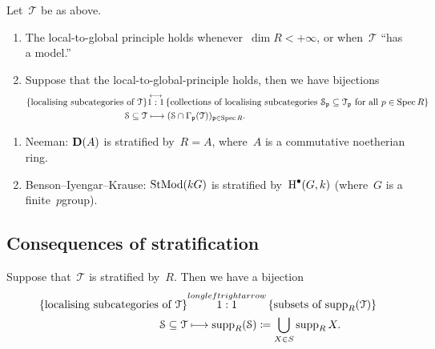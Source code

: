 \documentclass[10pt,a4paper]{article}
\begin{document}
\begin{proposition}
  Let~$\mathcal{T}$ be as above.
  \begin{enumerate}
    \item The local-to-global principle holds whenever~$\dim R<+\infty$, or when~$\mathcal{T}$ ``has a model.''
    \item Suppose that the local-to-global-principle holds, then we have bijections
      \begin{equation}
        \begin{aligned}
          \left\{ \text{localising subcategories of $\mathcal{T}$} \right\} & \overset{\longleftrightarrow}{1:1} \left\{ \text{collections of localising subcategories $\mathcal{S}_{\mathfrak{p}}\subseteq\mathcal{T}_{\mathfrak{p}}$ for all~$p\in\operatorname{Spec} R$} \right\} \\
          \mathcal{S}\subseteq\mathcal{T} & \longmapsto (\mathcal{S}\cap\Gamma_{\mathfrak{p}}(\mathcal{T}))_{\mathfrak{p}\in\operatorname{Spec} R}.
        \end{aligned}
      \end{equation}
  \end{enumerate}
\end{proposition}

\begin{example}
  \begin{enumerate}
    \item Neeman: $\mathbf{D}(A)$ is stratified by~$R=A$, where~$A$ is a commutative noetherian ring.
    \item Benson--Iyengar--Krause: $\operatorname{StMod}(kG)$ is stratified by~$\operatorname{H}^\bullet(G,k)$ (where~$G$ is a finite~$p$\dash group).
  \end{enumerate}
\end{example}

\subsection{Consequences of stratification}
\begin{theorem}
  Suppose that~$\mathcal{T}$ is stratified by~$R$. Then we have a bijection
  \begin{equation}
    \begin{aligned}
      \left\{ \text{localising subcategories of~$\mathcal{T}$} \right\} & \overset{longleftrightarrow}{1:1} \left\{ \text{subsets of $\operatorname{supp}_R(\mathcal{T})$} \right\} \\
      \mathcal{S}\subseteq\mathcal{T} & \longmapsto\operatorname{supp}_R(\mathcal{S})\coloneqq\bigcup_{X\in S}\operatorname{supp}_R X.
    \end{aligned}
  \end{equation}
\end{theorem}
\end{document}
